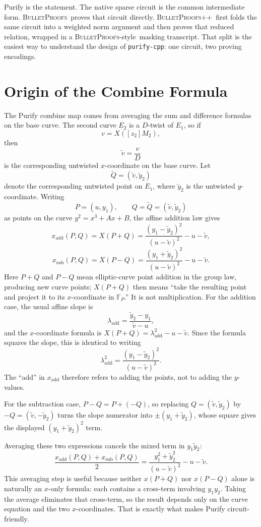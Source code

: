 \documentclass[11pt]{article}
\DeclareRobustCommand{\bp}{{\normalfont\scshape BulletProofs}}
\DeclareRobustCommand{\bppp}{{\normalfont\scshape BulletProofs++}}
\begin{document}
Purify is the statement. The native sparse circuit is the common intermediate form. \bp\ proves that
circuit directly. \bppp\ first folds the same circuit into a weighted norm argument and then proves
that reduced relation, wrapped in a \bp-style\ masking transcript. That split is the easiest
way to understand the design of \texttt{purify-cpp}: one circuit, two proving encodings.

\appendix

\section{Origin of the Combine Formula}
\label{app:combine-derivation}

The Purify combine map comes from averaging the sum and difference formulas on the base curve. The
second curve $E_2$ is a $D$-twist of $E_1$, so if
\[
v = X([z_2]M_2),
\]
then
\[
\tilde{v} = \frac{v}{D}
\]
is the corresponding untwisted $x$-coordinate on the base curve. Let
\[
\tilde{Q} = (\tilde{v}, \tilde{y}_2)
\]
denote the corresponding untwisted point on $E_1$, where $\tilde{y}_2$ is the untwisted
$y$-coordinate. Writing
\[
P = (u, y_1), \qquad Q = \tilde{Q} = (\tilde{v}, \tilde{y}_2)
\]
as points on the curve $y^2 = x^3 + Ax + B$, the affine addition law gives
\[
x_{\mathrm{add}}(P,Q) = X(P+Q) = \frac{(y_1 - \tilde{y}_2)^2}{(u - \tilde{v})^2} - u - \tilde{v},
\]
\[
x_{\mathrm{sub}}(P,Q) = X(P-Q) = \frac{(y_1 + \tilde{y}_2)^2}{(u - \tilde{v})^2} - u - \tilde{v}.
\]
Here $P+Q$ and $P-Q$ mean elliptic-curve point addition in the group law, producing new curve
points; $X(P+Q)$ then means ``take the resulting point and project it to its $x$-coordinate in
$\mathbb{F}_P$.'' It is not multiplication.
For the addition case, the usual affine slope is
\[
\lambda_{\mathrm{add}} = \frac{\tilde{y}_2 - y_1}{\tilde{v} - u},
\]
and the $x$-coordinate formula is $X(P+Q) = \lambda_{\mathrm{add}}^2 - u - \tilde{v}$. Since the
formula squares the slope, this is identical to writing
\[
\lambda_{\mathrm{add}}^2 = \frac{(y_1 - \tilde{y}_2)^2}{(u - \tilde{v})^2}.
\]
The ``add'' in $x_{\mathrm{add}}$ therefore refers to adding the points, not to adding the
$y$-values.

For the subtraction case, $P-Q = P+(-Q)$, so replacing $Q=(\tilde{v}, \tilde{y}_2)$ by
$-Q=(\tilde{v}, -\tilde{y}_2)$ turns the slope numerator into $\pm(y_1 + \tilde{y}_2)$, whose square gives the
displayed $(y_1 + \tilde{y}_2)^2$ term.

Averaging these two expressions cancels the mixed term in $y_1 \tilde{y}_2$:
\[
\frac{x_{\mathrm{add}}(P,Q) + x_{\mathrm{sub}}(P,Q)}{2}
=
\frac{y_1^2 + \tilde{y}_2^2}{(u - \tilde{v})^2} - u - \tilde{v}.
\]
This averaging step is useful because neither $x(P+Q)$ nor $x(P-Q)$ alone is naturally an
$x$-only formula: each contains a cross-term involving $y_1 y_2$. Taking the average eliminates
that cross-term, so the result depends only on the curve equation and the two $x$-coordinates.
That is exactly what makes Purify circuit-friendly.
\end{document}
